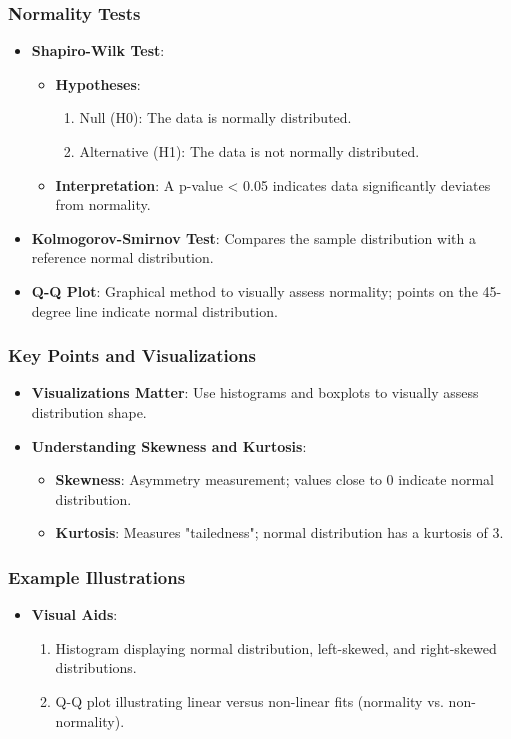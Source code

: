 \documentclass[aspectratio=169]{beamer}
\begin{document}
\begin{frame}[fragile]
    \frametitle{Normality Tests}
    \begin{itemize}
        \item \textbf{Shapiro-Wilk Test}:
            \begin{itemize}
                \item \textbf{Hypotheses}:
                    \begin{enumerate}
                        \item Null (H0): The data is normally distributed.
                        \item Alternative (H1): The data is not normally distributed.
                    \end{enumerate}
                \item \textbf{Interpretation}: A p-value < 0.05 indicates data significantly deviates from normality.
            \end{itemize}
        \item \textbf{Kolmogorov-Smirnov Test}: Compares the sample distribution with a reference normal distribution.
        \item \textbf{Q-Q Plot}: Graphical method to visually assess normality; points on the 45-degree line indicate normal distribution.
    \end{itemize}
\end{frame}

\begin{frame}[fragile]
    \frametitle{Key Points and Visualizations}
    \begin{itemize}
        \item \textbf{Visualizations Matter}: Use histograms and boxplots to visually assess distribution shape.
        \item \textbf{Understanding Skewness and Kurtosis}:
            \begin{itemize}
                \item \textbf{Skewness}: Asymmetry measurement; values close to 0 indicate normal distribution.
                \item \textbf{Kurtosis}: Measures "tailedness"; normal distribution has a kurtosis of 3.
            \end{itemize}
    \end{itemize}
\end{frame}

\begin{frame}[fragile]
    \frametitle{Example Illustrations}
    \begin{itemize}
        \item \textbf{Visual Aids}:
            \begin{enumerate}
                \item Histogram displaying normal distribution, left-skewed, and right-skewed distributions.
                \item Q-Q plot illustrating linear versus non-linear fits (normality vs. non-normality).
            \end{enumerate}
    \end{itemize}
\end{frame}
\end{document}
